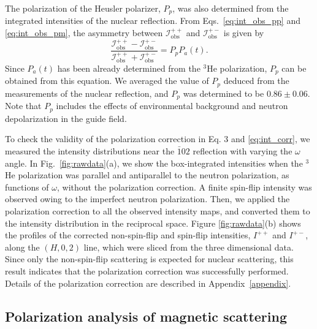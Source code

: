 \documentclass[%
 reprint,
superscriptaddress,
 amsmath,amssymb,
 aps,
floatfix,
]{revtex4-2}
\newcommand{\He}{$^3$He }
\begin{document}
The polarization of the Heusler polarizer, $P_p$, was also determined from the integrated intensities of the nuclear reflection.
From Eqs.~\ref{eq:int_obs_pp} and \ref{eq:int_obs_pm}, the asymmetry between $\mathcal{I}^{++}_\mathrm{obs}$ and $\mathcal{I}^{+-}_\mathrm{obs}$ is given by
\begin{equation}
    \frac{\mathcal{I}^{++}_\mathrm{obs}-\mathcal{I}^{+-}_\mathrm{obs}}{\mathcal{I}^{++}_\mathrm{obs}+\mathcal{I}^{+-}_\mathrm{obs}} = P_pP_a(t).
\end{equation}
Since $P_a(t)$ has been already determined from the \He polarization, $P_p$ can be obtained from this equation.
We averaged the value of $P_p$ deduced from the measurements of the nuclear reflection, and  $P_p$ was determined to be $0.86 \pm 0.06$.
Note that $P_p$ includes the effects of environmental background and neutron depolarization in the guide field.

To check the validity of the polarization correction in Eq. 3 and \ref{eq:int_corr}, we measured the intensity distributions near the $\bar{1}02$ reflection with varying the $\omega$ angle.
In Fig.~\ref{fig:rawdata}(a), we show the box-integrated intensities when the \He polarization was parallel and antiparallel to the neutron polarization, as functions of $\omega$, without the polarization correction.
A finite spin-flip intensity was observed owing to the imperfect neutron polarization. %
Then, we applied the polarization correction to all the observed intensity maps, and converted them to the intensity distribution in the reciprocal space. 
Figure \ref{fig:rawdata}(b) shows the profiles of the corrected non-spin-flip and spin-flip intensities, $I^{++}$ and $I^{+-}$, along the $(H,0,2)$ line, which were sliced from the three dimensional data. 
Since only the non-spin-flip scattering is expected for nuclear scattering, this result indicates that the polarization correction was successfully performed.
Details of the polarization correction are described in Appendix~\ref{appendix}.


\subsection{Polarization analysis of magnetic scattering}
\end{document}
